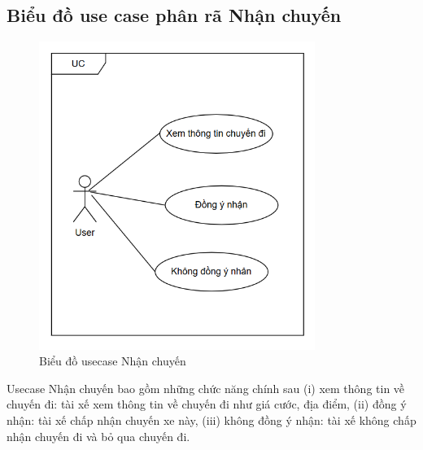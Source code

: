 \documentclass[../DoAn.tex]{subfiles}
\begin{document}
\subsection{Biểu đồ use case phân rã Nhận chuyến}
\label{subsection:2.2.5}
\begin{figure}[H]
  \centering
  \includegraphics[width=0.8\textwidth]{Hinhve/Usecase_nhan_chuyen.png}
  \caption{Biểu đồ usecase Nhận chuyến}
  \label{fig:use_case_nhan_chuyen}
\end{figure}
Usecase Nhận chuyến bao gồm những chức năng chính sau (i) xem thông tin về chuyến đi: tài xế xem thông tin về chuyến đi như giá cước, địa điểm, (ii) đồng ý nhận: tài xế chấp nhận chuyến xe này, (iii) không đồng ý nhận: tài xế không chấp nhận chuyến đi và bỏ qua chuyến đi.
\end{document}
